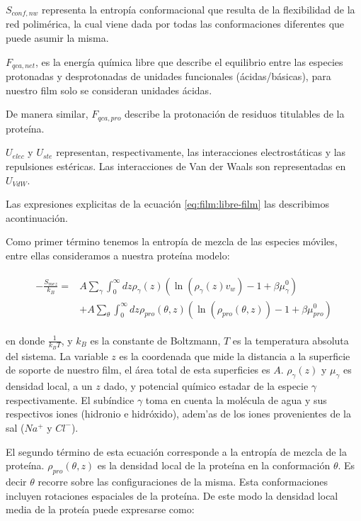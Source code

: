 $S_{conf,nw}$ representa la entrop\'ia conformacional que resulta de la flexibilidad de la red polim\'erica, la cual viene dada por todas las conformaciones diferentes que puede asumir la misma.

$F_{qca,net}$, es la energ\'ia qu\'imica libre que describe el equilibrio entre las especies protonadas y desprotonadas de unidades funcionales (\'acidas/b\'asicas), para nuestro film solo se consideran unidades \'acidas.

De manera similar, $F_{qca,pro}$ describe la protonaci\'on de residuos titulables de la prote\'ina.

$U_{elec}$ y $U_{ste}$ representan, respectivamente, las interacciones electrost\'aticas y las repulsiones est\'ericas.
Las interacciones de Van der Waals son representadas en $U_{VdW}$.


Las expresiones explicitas de la ecuaci\'on \ref{eq:film:libre-film} las describimos acontinuaci\'on.

Como primer t\'ermino tenemos la entrop\'ia de mezcla de  las especies m\'oviles, entre ellas consideramos a nuestra prote\'ina modelo:

\begin{align}
	\begin{aligned}
		-\frac{S_{mez}}{k_B}= &A\sum_{\gamma}\int_0^\infty{dz\rho_\gamma(z)\left(\ln \left(\rho_\gamma (z)v_w\right) -1 + \beta\mu^0_\gamma\right)} \\
		&+ A\sum_{\theta}\int_0^\infty{dz\rho_{pro}(\theta,z)\left(\ln \left(\rho_{pro}(\theta,z)\right) -1 + \beta\mu^0_{pro} \right)}
	\end{aligned}
\end{align}

\noindent en donde $\frac{1}{k_B T}$, y $k_B$ es la constante de Boltzmann, $T$ es la temperatura absoluta del sistema. La variable $z$ es la coordenada que mide la distancia a la superficie de soporte de nuestro film, el \'area total de esta superficies es $A$. $\rho_\gamma(z)$ y $\mu_\gamma$ es densidad local, a un $z$ dado, y potencial qu\'imico estadar de la especie $\gamma$ respectivamente.
El sub\'indice $\gamma$ toma en cuenta la mol\'ecula de agua y sus respectivos iones (hidronio e hidr\'oxido), adem'as de los iones provenientes de la sal ($Na^+$ y $Cl^-$). 


El segundo t\'ermino de esta ecuaci\'on corresponde a la entrop\'ia de mezcla de la prote\'ina. $\rho_{pro}(\theta,z)$ es la densidad local de la prote\'ina en la conformaci\'on $\theta$. Es decir $\theta$ recorre sobre las configuraciones de la misma.
Esta conformaciones incluyen rotaciones espaciales de la prote\'ina.
De este modo la densidad local media de la prote\'ia puede expresarse como:


